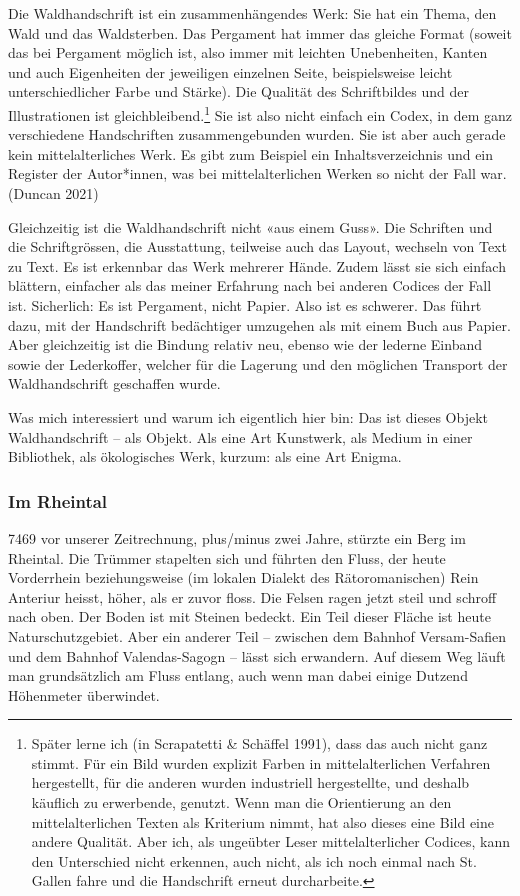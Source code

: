\documentclass[a4paper,
fontsize=11pt,
oneside,
numbers=noperiodatend,
parskip=half-,
bibliography=totoc,
final
]{scrartcl}
\begin{document}
Die Waldhandschrift ist ein zusammenhängendes Werk: Sie hat ein Thema,
den Wald und das Waldsterben. Das Pergament hat immer das gleiche Format
(soweit das bei Pergament möglich ist, also immer mit leichten
Unebenheiten, Kanten und auch Eigenheiten der jeweiligen einzelnen
Seite, beispielsweise leicht unterschiedlicher Farbe und Stärke). Die
Qualität des Schriftbildes und der Illustrationen ist
gleichbleibend.\footnote{Später lerne ich (in Scrapatetti \& Schäffel
  1991), dass das auch nicht ganz stimmt. Für ein Bild wurden explizit
  Farben in mittelalterlichen Verfahren hergestellt, für die anderen
  wurden industriell hergestellte, und deshalb käuflich zu erwerbende,
  genutzt. Wenn man die Orientierung an den mittelalterlichen Texten als
  Kriterium nimmt, hat also dieses eine Bild eine andere Qualität. Aber
  ich, als ungeübter Leser mittelalterlicher Codices, kann den
  Unterschied nicht erkennen, auch nicht, als ich noch einmal nach St.
  Gallen fahre und die Handschrift erneut durcharbeite.} Sie ist also
nicht einfach ein Codex, in dem ganz verschiedene Handschriften
zusammengebunden wurden. Sie ist aber auch gerade kein mittelalterliches
Werk. Es gibt zum Beispiel ein Inhaltsverzeichnis und ein Register der
Autor*innen, was bei mittelalterlichen Werken so nicht der Fall war.
(Duncan 2021)

Gleichzeitig ist die Waldhandschrift nicht «aus einem Guss». Die
Schriften und die Schriftgrössen, die Ausstattung, teilweise auch das
Layout, wechseln von Text zu Text. Es ist erkennbar das Werk mehrerer
Hände. Zudem lässt sie sich einfach blättern, einfacher als das meiner
Erfahrung nach bei anderen Codices der Fall ist. Sicherlich: Es ist
Pergament, nicht Papier. Also ist es schwerer. Das führt dazu, mit der
Handschrift bedächtiger umzugehen als mit einem Buch aus Papier. Aber
gleichzeitig ist die Bindung relativ neu, ebenso wie der lederne Einband
sowie der Lederkoffer, welcher für die Lagerung und den möglichen
Transport der Waldhandschrift geschaffen wurde.

Was mich interessiert und warum ich eigentlich hier bin: Das ist dieses
Objekt Waldhandschrift -- als Objekt. Als eine Art Kunstwerk, als Medium
in einer Bibliothek, als ökologisches Werk, kurzum: als eine Art Enigma.

\subsubsection{Im Rheintal}\label{im-rheintal}

7469 vor unserer Zeitrechnung, plus/minus zwei Jahre, stürzte ein Berg
im Rheintal. Die Trümmer stapelten sich und führten den Fluss, der heute
Vorderrhein beziehungsweise (im lokalen Dialekt des Rätoromanischen)
Rein Anteriur heisst, höher, als er zuvor floss. Die Felsen ragen jetzt
steil und schroff nach oben. Der Boden ist mit Steinen bedeckt. Ein Teil
dieser Fläche ist heute Naturschutzgebiet. Aber ein anderer Teil --
zwischen dem Bahnhof Versam-Safien und dem Bahnhof Valendas-Sagogn --
lässt sich erwandern. Auf diesem Weg läuft man grundsätzlich am Fluss
entlang, auch wenn man dabei einige Dutzend Höhenmeter überwindet.
\end{document}
